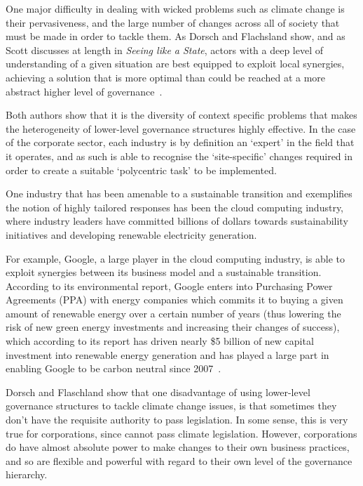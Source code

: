 One major difficulty in dealing with wicked problems such as climate
change is their pervasiveness, and the large number of changes across
all of society that must be made in order to tackle them. As Dorsch
and Flachsland show, and as Scott discusses at length in
\textit{Seeing like a State}, actors with a deep level of
understanding of a given situation are best equipped to exploit local
synergies, achieving a solution that is more optimal than could be
reached at a more abstract higher level of
governance~\citep{dorsch2017polycentric,scott1998seeing}.

Both authors show that it is the diversity of context specific
problems that makes the heterogeneity of lower-level governance
structures highly effective. In the case of the corporate sector, each
industry is by definition an `expert' in the field that it operates,
and as such is able to recognise the `site-specific' changes
required in order to create a suitable `polycentric task' to be
implemented.

One industry that has been amenable to a sustainable transition and
exemplifies the notion of highly tailored responses has been the cloud
computing industry, where industry leaders have committed billions of
dollars towards sustainability initiatives and developing renewable
electricity generation.

For example, Google, a large player in the cloud computing industry,
is able to exploit synergies between its business model and a
sustainable transition. According to its environmental report, Google
enters into Purchasing Power Agreements (PPA) with energy companies
which commits it to buying a given amount of renewable energy over a
certain number of years (thus lowering the risk of new green energy
investments and increasing their changes of success), which according
to its report has driven nearly \$5 billion of new capital investment
into renewable energy generation and has played a large part in
enabling Google to be carbon neutral since
2007~\citep{google,google2013}.

Dorsch and Flaschland show that one disadvantage of using lower-level
governance structures to tackle climate change issues, is that
sometimes they don't have the requisite authority to pass
legislation. In some sense, this is very true for corporations, since
cannot pass climate legislation. However, corporations do have almost
absolute power to make changes to their own business practices, and so
are flexible and powerful with regard to their own level of the
governance hierarchy.

